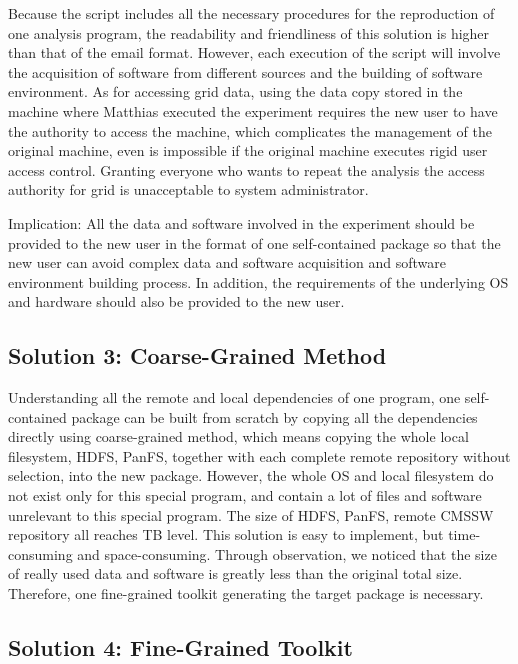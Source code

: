 \documentclass{acm_proc_article-sp}
\begin{document}
Because the script includes all the necessary procedures for the reproduction of one analysis program, the readability and friendliness of this solution is higher than that of the email format. However, each execution of the script will involve the acquisition of software from different sources and the building of software environment. As for accessing grid data, using the data copy stored in the machine where Matthias executed the experiment requires the new user to have the authority to access the machine, which complicates the management of the original machine, even is impossible if the original machine executes rigid user access control. Granting everyone who wants to repeat the analysis the access authority for grid is unacceptable to system administrator. 

Implication: All the data and software involved in the experiment should be
provided to the new user in the format of one self-contained package so that
the new user can avoid complex data and software acquisition and software
environment building process. In addition, the requirements of the underlying
OS and hardware should also be provided to the new user.

\subsection{Solution 3: Coarse-Grained Method}

Understanding all the remote and local dependencies of one program, one self-contained package can be built from scratch by copying all the dependencies directly using coarse-grained method,
which means copying the whole local filesystem, HDFS, PanFS, together with each complete remote repository without selection, into the new package.
However, the whole OS and local filesystem do not exist only for this special program, and contain a lot of files and software unrelevant to this special program. 
The size of HDFS, PanFS, remote CMSSW repository all reaches TB level. 
This solution is easy to implement, but time-consuming and space-consuming.
Through observation, we noticed that the size of really used data and software is greatly less than the original total size. 
Therefore, one fine-grained toolkit generating the target package is necessary.

\subsection{Solution 4: Fine-Grained Toolkit}
\end{document}

